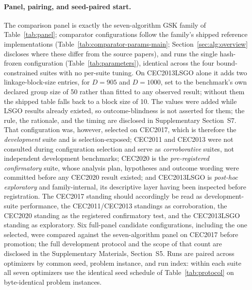 \paragraph{Panel, pairing, and seed-paired start.}
The comparison panel is exactly the seven-algorithm GSK family of
Table~\ref{tab:panel}; comparator configurations follow the family's
shipped reference implementations
(Table~\ref{tab:comparator-params-main};
Section~\ref{sec:alg:overview} discloses where these differ from the
source papers), and \dtgsk{} runs the single hash-frozen configuration
(Table~\ref{tab:parameters}), identical across the four bound-constrained
suites with no per-suite tuning. On CEC2013LSGO alone it adds two
linkage-block-size entries, for $D = 905$ and $D = 1000$, set to the
benchmark's own declared group size of 50 rather than fitted to any
observed result; without them the shipped table falls back to a block
size of 10. The values were added while LSGO results already existed, so
outcome-blindness is not asserted for them; the rule, the rationale, and
the timing are disclosed in Supplementary Section~S7.
That configuration was, however,
selected on CEC2017, which is therefore the \emph{development} suite and is
selection-exposed; CEC2011 and CEC2013 were not consulted during
configuration selection and serve as \emph{corroborative} suites, not
independent development benchmarks; CEC2020 is the \emph{pre-registered
confirmatory} suite, whose analysis plan, hypotheses and outcome wording
were committed before any CEC2020 result existed; and CEC2013LSGO is
\emph{post-hoc exploratory} and family-internal, its descriptive layer
having been inspected before registration. The CEC2017 standing should
accordingly be
read as development-suite performance, the CEC2011/CEC2013 standings as
corroboration, the CEC2020 standing as the registered confirmatory test,
and the CEC2013LSGO standing as exploratory. Six full-panel candidate
configurations, including the one
selected, were compared against the seven-algorithm panel on CEC2017 before
promotion; the full development protocol and the scope of that count are
disclosed in the Supplementary Materials, Section~S5.
Runs are paired across optimizers by common seed, problem instance, and
run index: within each suite all seven optimizers use the identical seed
schedule of Table~\ref{tab:protocol} on byte-identical problem instances.
